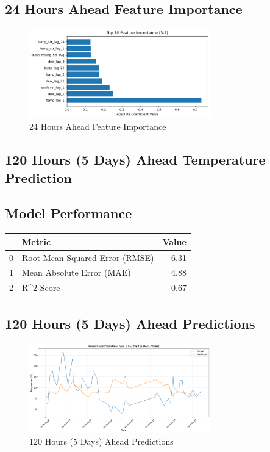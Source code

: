 \subsection{24 Hours Ahead Feature Importance}
\begin{figure}[htbp]
\centering
\includegraphics[width=0.7\textwidth]{5-1-linear_temp_feature_importance.png}
\caption{24 Hours Ahead Feature Importance}
\label{fig:24_hours_ahead_featimp}
\end{figure}



\subsection{120 Hours (5 Days) Ahead Temperature Prediction}
\subsection{Model Performance}
\begin{tabular}{llr}
\toprule
 & Metric & Value \\
\midrule
0 & Root Mean Squared Error (RMSE) & 6.31 \\
1 & Mean Absolute Error (MAE) & 4.88 \\
2 & R^2 Score & 0.67 \\
\bottomrule
\end{tabular}

\subsection{120 Hours (5 Days) Ahead Predictions}
\begin{figure}[htbp]
\centering
\includegraphics[width=0.7\textwidth]{5-2-linear_temp_prediction_results.png}
\caption{120 Hours (5 Days) Ahead Predictions}
\label{fig:120_hours_(5_days)_ahead_pred}
\end{figure}

